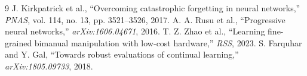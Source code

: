 \documentclass[10pt,twocolumn]{article}
\begin{document}
\begin{thebibliography}{9}
 J. Kirkpatrick et al., ``Overcoming catastrophic forgetting in neural networks,'' \textit{PNAS}, vol. 114, no. 13, pp. 3521--3526, 2017.
 A. A. Rusu et al., ``Progressive neural networks,'' \textit{arXiv:1606.04671}, 2016.
 T. Z. Zhao et al., ``Learning fine-grained bimanual manipulation with low-cost hardware,'' \textit{RSS}, 2023.
 S. Farquhar and Y. Gal, ``Towards robust evaluations of continual learning,'' \textit{arXiv:1805.09733}, 2018.
\end{thebibliography}
\end{document}
